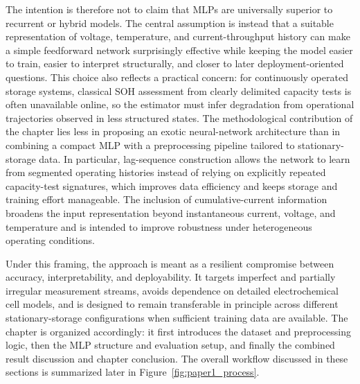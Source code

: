 \documentclass[
    a4paper,
    12pt,
    titlepage,
    bibliography=totoc,
    twoside=on,
    parskip=false,
    numbers=noenddot,
    cleardoublepage=empty,
    DIV=12,
    BCOR=12.0mm,
    headheight=36pt,
    headings=openright
]{scrreprt}
\begin{document}
The intention is therefore not to claim that MLPs are universally superior to recurrent or hybrid models. The central assumption is instead that a suitable representation of voltage, temperature, and current-throughput history can make a simple feedforward network surprisingly effective while keeping the model easier to train, easier to interpret structurally, and closer to later deployment-oriented questions. This choice also reflects a practical concern: for continuously operated storage systems, classical SOH assessment from clearly delimited capacity tests is often unavailable online, so the estimator must infer degradation from operational trajectories observed in less structured states.\autocite{makridakisStatisticalMachineLearning2018,howStateChargeEstimation2019a,hossainlipuDatadrivenStateCharge2020} The methodological contribution of the chapter lies less in proposing an exotic neural-network architecture than in combining a compact MLP with a preprocessing pipeline tailored to stationary-storage data. In particular, lag-sequence construction allows the network to learn from segmented operating histories instead of relying on explicitly repeated capacity-test signatures, which improves data efficiency and keeps storage and training effort manageable. The inclusion of cumulative-current information broadens the input representation beyond instantaneous current, voltage, and temperature and is intended to improve robustness under heterogeneous operating conditions.

Under this framing, the approach is meant as a resilient compromise between accuracy, interpretability, and deployability. It targets imperfect and partially irregular measurement streams, avoids dependence on detailed electrochemical cell models, and is designed to remain transferable in principle across different stationary-storage configurations when sufficient training data are available. The chapter is organized accordingly: it first introduces the dataset and preprocessing logic, then the MLP structure and evaluation setup, and finally the combined result discussion and chapter conclusion. The overall workflow discussed in these sections is summarized later in Figure~\ref{fig:paper1_process}.
\end{document}
